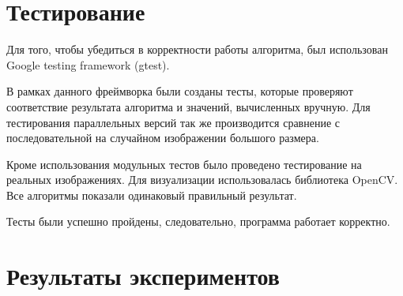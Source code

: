 \documentclass{report}
\begin{document}
    \section*{Тестирование}
    \par Для того, чтобы убедиться в корректности работы алгоритма, был использован Google testing framework (gtest).
    \par В рамках данного фреймворка были созданы тесты, которые проверяют соответствие результата алгоритма и значений, вычисленных вручную. Для тестирования параллельных версий так же производится сравнение с последовательной на случайном изображении большого размера.
    \par Кроме использования модульных тестов было проведено тестирование на реальных изображениях. Для визуализации использовалась библиотека OpenCV. Все алгоритмы показали одинаковый правильный результат.
    \par Тесты были успешно пройдены, следовательно, программа работает корректно.
    
    \newpage
    \section*{Результаты экспериментов}
    
\end{document}
